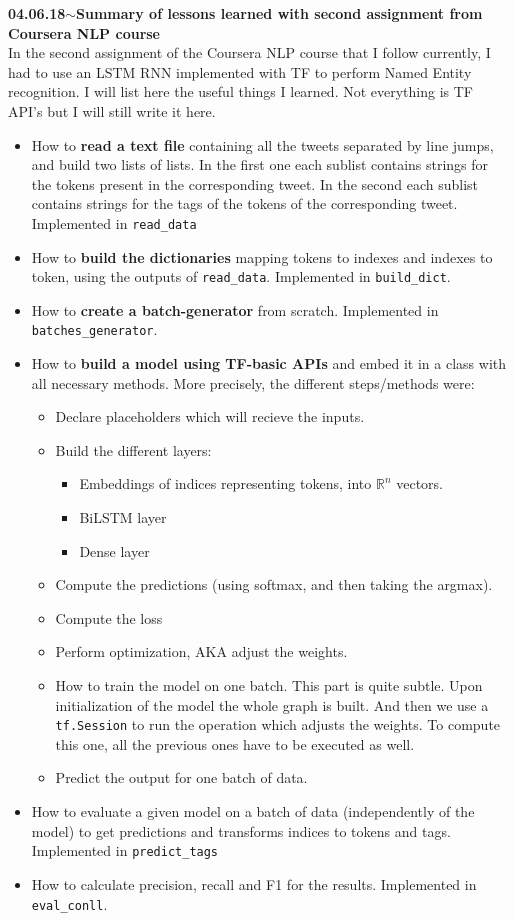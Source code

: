 \documentclass[11pt,a4paper]{article}
\newenvironment{loggentry}[2]%
{\noindent\textbf{#1}\hspace{1cm}$\mathbf{\sim}$\text{ }\textbf{#2}\\}{\vspace{0.5cm}}
\begin{document}
\begin{loggentry}{04.06.18}{Summary of lessons learned with second assignment from Coursera NLP course}
In the second assignment of the Coursera NLP course that I follow currently, I had to use an LSTM RNN implemented with TF to perform Named Entity recognition. I will list here the useful things I learned. Not everything is TF API's but I will still write it here.
\begin{itemize}
\item How to \textbf{read a text file} containing all the tweets separated by line jumps, and build two lists of lists. In the first one each sublist contains strings for the tokens present in the corresponding tweet. In the second each sublist contains strings for the tags of the tokens of the corresponding tweet. Implemented in \texttt{read\_data}
\item How to \textbf{build the dictionaries} mapping tokens to indexes and indexes to token, using the outputs of \texttt{read\_data}. Implemented in \texttt{build\_dict}.
\item How to \textbf{create a batch-generator} from scratch. Implemented in \texttt{batches\_generator}.
\item How to \textbf{build a model using TF-basic APIs} and embed it in a class with all necessary methods. More precisely, the different steps/methods were:
\begin{itemize}
\item Declare placeholders which will recieve the inputs.
\item Build the different layers:\begin{itemize}
\item Embeddings of indices representing tokens, into $\mathbb{R}^n$ vectors.
\item BiLSTM layer
\item Dense layer
\end{itemize}
\item Compute the predictions (using softmax, and then taking the argmax).
\item Compute the loss
\item Perform optimization, AKA adjust the weights.
\item How to train the model on one batch. This part is quite subtle. Upon initialization of the model the whole graph is built. And then we use a \texttt{tf.Session} to run the operation which adjusts the weights. To compute this one, all the previous ones have to be executed as well.
\item Predict the output for one batch of data.
\end{itemize}
\item How to evaluate a given model on a batch of data (independently of the model) to get predictions and transforms indices to tokens and tags. Implemented in \texttt{predict\_tags}
\item How to calculate precision, recall and F1 for the results. Implemented in \texttt{eval\_conll}.
\end{itemize}
\end{loggentry}
\end{document}
